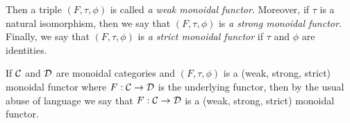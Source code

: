 \begin{definition}
\begin{center}
\end{center}
Then a triple $(F,\tau,\phi)$ is called \textit{a weak monoidal functor}. Moreover, if $\tau$ is a natural isomorphism, then we say that $(F,\tau,\phi)$ is \textit{a strong monoidal functor}. Finally, we say that $(F,\tau,\phi)$ is \textit{a strict monoidal functor} if $\tau$ and $\phi$ are identities.
\end{definition}
\noindent
If ${\mathcal C}$ and ${\mathcal D}$ are monoidal categories and $(F,\tau,\phi)$ is a (weak, strong, strict) monoidal functor where $F:{\mathcal C}\rightarrow {\mathcal D}$ is the underlying functor, then by the usual abuse of language we say that $F:{\mathcal C}\rightarrow {\mathcal D}$ is a (weak, strong, strict) monoidal functor.

